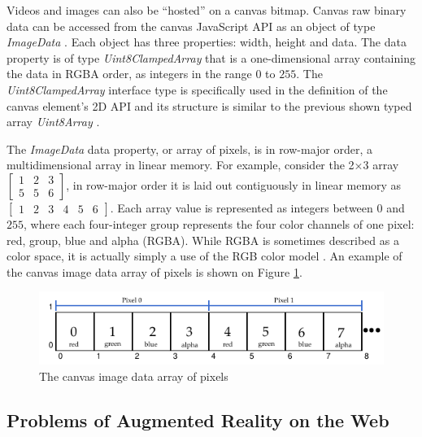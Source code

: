  Videos and images can also be ``hosted'' on a canvas bitmap. Canvas raw binary data can be accessed from the canvas JavaScript API as an object of type \textit{ImageData} \cite{Canvas2013}. Each object has three properties: width, height and data. The data property is of type \textit{Uint8ClampedArray} that is a one-dimensional array containing the data in RGBA order, as integers in the range $0$ to $255$. The \textit{Uint8ClampedArray} interface type is specifically used in the definition of the canvas element's 2D API and its structure is  similar to the previous shown typed array \textit{Uint8Array} \cite{Canvas2013} \cite{TypedArray2013}.

The \textit{ImageData} data property, or array of pixels, is in row-major order, a multidimensional array in linear memory. For example, consider the 2×3 array $\begin{bmatrix}
1 & 2 & 3\\
5 & 5 & 6
\end{bmatrix}$, in row-major order it is laid out contiguously in linear memory as $\begin{bmatrix}
1 & 2 & 3 & 4 & 5 & 6
\end{bmatrix}$. Each array value is represented as integers between $0$ and $255$, where each four-integer group represents the four color channels of one pixel: red, group, blue and alpha (RGBA). While RGBA is sometimes described as a color space, it is actually simply a use of the RGB color model \cite{Gonzalez2007}. An example of the canvas image data array of pixels is shown on Figure \ref{figure:imagedata_array}.

\begin{figure}[!htb]
  \centering
  \includegraphics[width=\linewidth]{chapters/basic_concepts/imagedata_array.pdf}
  \caption{The canvas image data array of pixels}
  \label{figure:imagedata_array}
\end{figure}



\subsection{Problems of Augmented Reality on the Web} %
\label{sub:basic_concepts:web:problems_of_augmented_reality_on_the_web}

